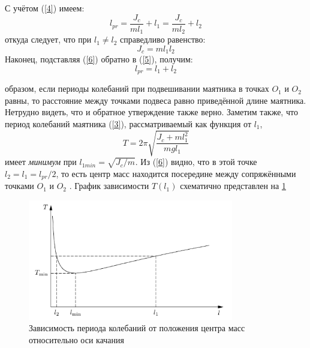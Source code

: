 \documentclass[a4paper, 12pt]{article}
\begin{document}
\RaggedRight С учётом (\ref{4}) имеем:
\begin{equation}
\label{5}
    l_{pr} = \frac{J_c}{ml_1} + l_1 = \frac{J_c}{ml_2} + l_2
\end{equation}
\RaggedRight откуда следует, что при $l_1 \neq l_2$ справедливо равенство:
\begin{equation}
\label{6}
    J_c = ml_1l_2
\end{equation}
\newpage
\RaggedRight Наконец, подставляя (\ref{6}) обратно в (\ref{5}), получим:
\begin{equation}
    \label{7}
    l_{pr} = l_1 + l_2
\end{equation}

 образом, если периоды колебаний при подвешивании маятника в точках $\textit{O}_1$ и $\textit{O}_2$ равны, то расстояние между точками подвеса равно приведённой длине маятника. Нетрудно видеть, что и обратное утверждение также верно. 
Заметим также, что период колебаний маятника (\ref{3}), рассматриваемый как функция от $l_1$,
\[
T = 2\pi \sqrt{\frac{J_c + ml_1^2}{mgl_1}}
\]
имеет \textit{минимум} при $l_{1\textit{min}} = \sqrt{J_c/m}$. Из (\ref{6}) видно, что в этой точке $l_2 = l_1 = l_{pr}/2$, то есть центр масс находится посередине между сопряжёнными
точками $\textit{O}_1$ и $\textit{O}_2$ . График зависимости $T(l_1)$ схематично представлен на \ref{graf}
\begin{figure}[h!]
		\begin{center}
			\includegraphics[width = 0.8\textwidth]{2.png}
			\caption{Зависимость периода колебаний от положения центра масс относительно оси качания}
			\label{graf}
		\end{center}
	\end{figure}
\newline
\end{document}
